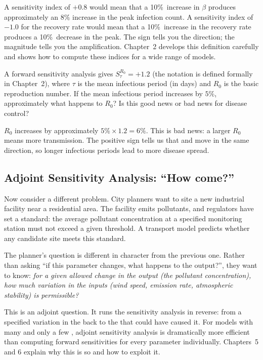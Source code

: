 A sensitivity index of $+0.8$ would mean that a 10\%\ increase in
$\beta$ produces approximately an $8\%$ increase in the peak infection
count. A sensitivity index of $-1.0$ for the recovery rate would mean
that a 10\%\ increase in the recovery rate produces a 10\%\ decrease
in the peak. The sign tells you the direction; the magnitude tells you
the amplification. Chapter~2 develops this definition carefully and
shows how to compute these indices for a wide range of models.

\begin{selfcheck}
A forward sensitivity analysis gives $S_{\tau}^{R_0} = +1.2$ (the notation is defined formally in Chapter~2),
where $\tau$ is the mean infectious period (in days) and $R_0$ is
the basic reproduction number.
If the mean infectious period increases by $5\%$, approximately
what happens to $R_0$? Is this good news or bad news for disease control?
\end{selfcheck}
\begin{scAnswer}
$R_0$ increases by approximately $5\% \times 1.2 = 6\%$. This is bad news:
a larger $R_0$ means more transmission. The positive sign tells us that
\POI and \QOI move in the same direction, so longer infectious periods
lead to more disease spread.
\end{scAnswer}

\subsection{Adjoint Sensitivity Analysis: ``How come?''}

Now consider a different problem. City planners want to site a new
industrial facility near a residential area. The facility emits
pollutants, and regulators have set a standard: the average pollutant
concentration at a specified monitoring station must not exceed a
given threshold. A transport model predicts whether any candidate
site meets this standard.

The planner's question is different in character from the previous one.
Rather than asking ``if this parameter changes, what happens to the
output?'', they want to know: \emph{for a given allowed change in the
output (the pollutant concentration), how much variation in the inputs
(wind speed, emission rate, atmospheric stability) is permissible?}

This is an adjoint question. It runs the sensitivity analysis in
reverse: from a specified variation in the \QOI back to the
\POIs that could have caused it. For models with many \POIs
and only a few \QOIs, adjoint sensitivity analysis is
dramatically more efficient than computing forward sensitivities
for every parameter individually. Chapters~5 and 6 explain
why this is so and how to exploit it.

